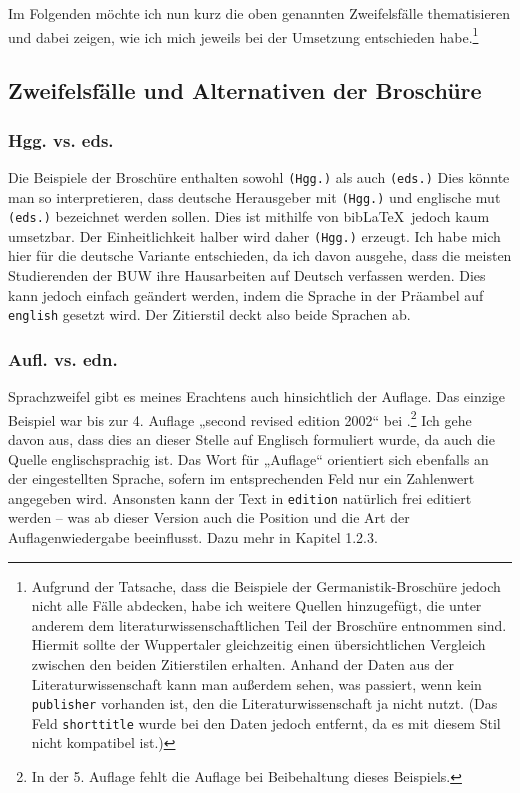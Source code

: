 \documentclass[12pt,notitlepage,parskip]{scrartcl}
\begin{document}
Im Folgenden möchte ich nun kurz die oben genannten Zweifelsfälle thematisieren
und dabei zeigen, wie ich mich jeweils bei der Umsetzung entschieden
habe.\footnote{Aufgrund der Tatsache, dass die Beispiele der
Germanistik-Broschüre jedoch nicht alle Fälle abdecken, habe ich weitere Quellen
hinzugefügt, die unter anderem dem literaturwissenschaftlichen Teil der
Broschüre entnommen sind. Hiermit sollte der Wuppertaler gleichzeitig einen
übersichtlichen Vergleich zwischen den beiden Zitierstilen erhalten. Anhand
der Daten aus der Literaturwissenschaft kann man außerdem sehen, was passiert, wenn
kein \texttt{publisher} vorhanden ist, den die Literaturwissenschaft ja nicht
nutzt. (Das Feld \texttt{shorttitle} wurde bei den Daten jedoch entfernt, da
es mit diesem Stil nicht kompatibel ist.)}

\subsection{Zweifelsfälle und Alternativen der Broschüre}
\subsubsection{Hgg. vs. eds.}
Die Beispiele der Broschüre enthalten sowohl \texttt{(Hgg.)} als auch
\texttt{(eds.)} Dies könnte man so interpretieren, dass deutsche Herausgeber mit
\texttt{(Hgg.)} und englische mut \texttt{(eds.)} bezeichnet werden sollen.
Dies ist mithilfe von bib\LaTeX\ jedoch kaum umsetzbar. Der Einheitlichkeit
halber wird daher \texttt{(Hgg.)} erzeugt. Ich habe mich hier für die deutsche
Variante entschieden, da ich davon ausgehe, dass die meisten Studierenden der
BUW ihre Hausarbeiten auf Deutsch verfassen werden. Dies kann jedoch einfach
geändert werden, indem die Sprache in der Präambel auf \texttt{english} gesetzt
wird. Der Zitierstil deckt also beide Sprachen ab.

\subsubsection{Aufl. vs. edn.}
Sprachzweifel gibt es meines Erachtens auch hinsichtlich der Auflage.
Das einzige Beispiel war bis zur 4. Auflage „second revised edition 2002“ bei
\textcite{schatz2}.\footnote{In der 5. Auflage fehlt die Auflage bei
Beibehaltung dieses Beispiels.}
Ich gehe davon aus, dass dies an dieser Stelle auf Englisch formuliert wurde, da
auch die Quelle englischsprachig ist. Das Wort für „Auflage“ orientiert sich
ebenfalls an der eingestellten Sprache, sofern im entsprechenden Feld nur ein
Zahlenwert angegeben wird. Ansonsten kann der Text in \texttt{edition} natürlich
frei editiert werden – was ab dieser Version auch die Position und die Art der
Auflagenwiedergabe beeinflusst. Dazu mehr in Kapitel 1.2.3.
\end{document}
